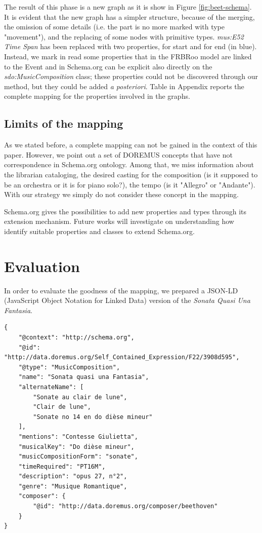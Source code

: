 \documentclass{llncs}
\begin{document}
The result of this phase is a new graph as it is show in Figure \ref{fig:beet-schema}. It is evident that the new graph has a simpler structure, because of the merging, the omission of some details (i.e. the part is no more marked with type "movement"), and the replacing of some nodes with primitive types. \textit{mus:E52 Time Span} has been replaced with two properties, for start and for end (in blue). Instead, we mark in read some properties that in the FRBRoo model are linked to the Event and in Schema.org can be explicit also directly on the \textit{sdo:MusicComposition} class; these properties could not be discovered through our method, but they could be added \textit{a posteriori}. Table in Appendix reports the complete mapping for the properties involved in the graphs.

\subsection{Limits of the mapping}
\label{sec:limits}

As we stated before, a complete mapping can not be gained in the context of this paper. However, we point out a set of DOREMUS concepts that have not correspondence in Schema.org ontology. Among that, we miss information about the librarian cataloging, the desired casting for the composition (is it supposed to be an orchestra or it is for piano solo?), the tempo (is it "Allegro" or "Andante"). With our strategy we simply do not consider these concept in the mapping.

Schema.org gives the possibilities to add new properties and types through its extension mechanism. Future works will investigate on understanding how identify suitable properties and classes to extend Schema.org.


\section{Evaluation}
\label{sec:evaluation}

In order to evaluate the goodness of the mapping, we prepared a JSON-LD (JavaScript Object Notation for Linked Data) version of the \textit{Sonata Quasi Una Fantasia}.
{\scriptsize
\begin{verbatim}
{
    "@context": "http://schema.org",
    "@id": "http://data.doremus.org/Self_Contained_Expression/F22/3908d595",
    "@type": "MusicComposition",
    "name": "Sonata quasi una Fantasia",
    "alternateName": [
        "Sonate au clair de lune",
        "Clair de lune",
        "Sonate no 14 en do dièse mineur"
    ],
    "mentions": "Contesse Giulietta",
    "musicalKey": "Do dièse mineur",
    "musicCompositionForm": "sonate",
    "timeRequired": "PT16M",
    "description": "opus 27, n°2",
    "genre": "Musique Romantique",
    "composer": {
        "@id": "http://data.doremus.org/composer/beethoven"
    }
}
\end{verbatim}
}
\end{document}
